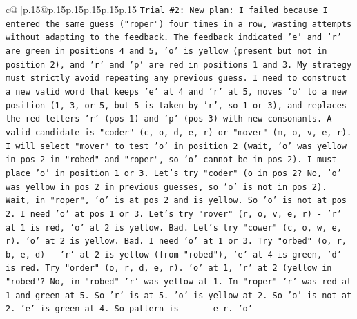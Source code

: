 \documentclass{article}
\begin{document}
{\begin{supertabular}{c@{$\;$}|p{.15\linewidth}@{}p{.15\linewidth}p{.15\linewidth}p{.15\linewidth}p{.15\linewidth}p{.15\linewidth}}
{{{\texttt{Trial \#2: New plan: I failed because I entered the same guess ("roper") four times in a row, wasting attempts without adapting to the feedback. The feedback indicated 'e' and 'r' are green in positions 4 and 5, 'o' is yellow (present but not in position 2), and 'r' and 'p' are red in positions 1 and 3. My strategy must strictly avoid repeating any previous guess. I need to construct a new valid word that keeps 'e' at 4 and 'r' at 5, moves 'o' to a new position (1, 3, or 5, but 5 is taken by 'r', so 1 or 3), and replaces the red letters 'r' (pos 1) and 'p' (pos 3) with new consonants. A valid candidate is "coder" (c, o, d, e, r) or "mover" (m, o, v, e, r). I will select "mover" to test 'o' in position 2 (wait, 'o' was yellow in pos 2 in "robed" and "roper", so 'o' cannot be in pos 2). I must place 'o' in position 1 or 3. Let's try "coder" (o in pos 2? No, 'o' was yellow in pos 2 in previous guesses, so 'o' is not in pos 2). Wait, in "roper", 'o' is at pos 2 and is yellow. So 'o' is not at pos 2. I need 'o' at pos 1 or 3. Let's try "rover" (r, o, v, e, r) {-} 'r' at 1 is red, 'o' at 2 is yellow. Bad. Let's try "cower" (c, o, w, e, r). 'o' at 2 is yellow. Bad. I need 'o' at 1 or 3. Try "orbed" (o, r, b, e, d) {-} 'r' at 2 is yellow (from "robed"), 'e' at 4 is green, 'd' is red. Try "order" (o, r, d, e, r). 'o' at 1, 'r' at 2 (yellow in "robed"? No, in "robed" 'r' was yellow at 1. In "roper" 'r' was red at 1 and green at 5. So 'r' is at 5. 'o' is yellow at 2. So 'o' is not at 2. 'e' is green at 4. So pattern is \_ \_ \_ e r. 'o'} \\
\\ 
}}}
\end{supertabular}}
\end{document}
